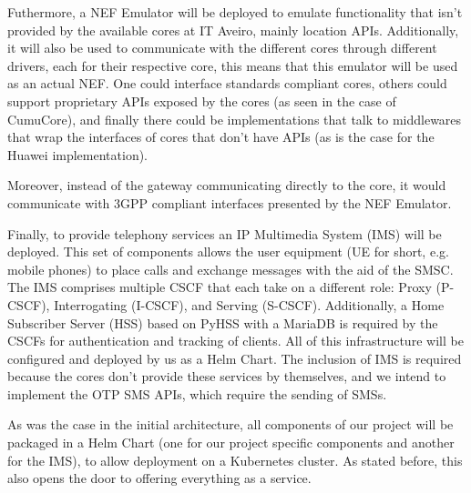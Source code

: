 Futhermore, a NEF Emulator will be deployed to emulate functionality that isn't
provided by the available cores at IT Aveiro, mainly location APIs.
Additionally, it will also be used to communicate with the different cores
through different drivers, each for their respective core, this means that this
emulator will be used as an actual NEF. One could interface standards compliant
cores, others could support proprietary APIs exposed by the cores (as seen in
the case of CumuCore), and finally there could be implementations that talk to
middlewares that wrap the interfaces of cores that don't have APIs (as is the
case for the Huawei implementation).

Moreover, instead of the gateway communicating directly to the core, it would
communicate with 3GPP compliant interfaces presented by the NEF Emulator.

Finally, to provide telephony services an IP Multimedia System (IMS) will be
deployed. This set of components allows the user equipment (UE for short, e.g.
mobile phones) to place calls and exchange messages with the aid of the SMSC.
The IMS comprises multiple CSCF that each take on a different role: Proxy
(P-CSCF), Interrogating (I-CSCF), and Serving (S-CSCF). Additionally, a Home
Subscriber Server (HSS) based on PyHSS with a MariaDB is required by the CSCFs
for authentication and tracking of clients. All of this infrastructure will be
configured and deployed by us as a Helm Chart. The inclusion of IMS is required
because the cores don't provide these services by themselves, and we intend to
implement the OTP SMS APIs, which require the sending of SMSs.

As was the case in the initial architecture, all components of our project will
be packaged in a Helm Chart (one for our project specific components and
another for the IMS), to allow deployment on a Kubernetes cluster. As stated
before, this also opens the door to offering everything as a service.
